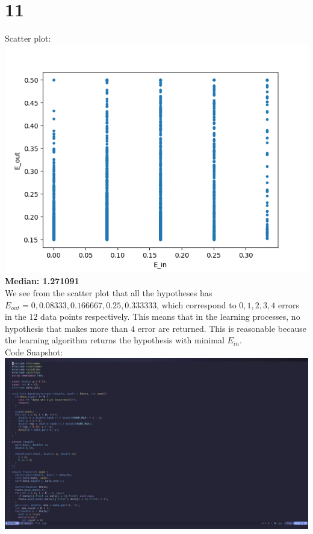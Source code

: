 \documentclass[11pt]{article}
\theoremstyle{definition}
\begin{document}
\section*{11}
Scatter plot: \\ 
\includegraphics{P11_2.png} \\
\textbf{Median: 1.271091} \\
We see from the scatter plot that all the hypotheses has $E_{out} = 0, 0.08333, 0.166667, 0.25, 0.333333$, which correspond to $0, 1, 2, 3, 4$ errors in the $12$ data points respectively. This means that in the learning processes, no hypothesis that makes more than $4$ error are returned. This is reasonable because the learning algorithm returns the hypothesis with minimal $E_{in}$. \\ 
Code Snapshot: \\ 
\includegraphics[width = \textwidth]{P11code.png}
\newpage
\end{document}
